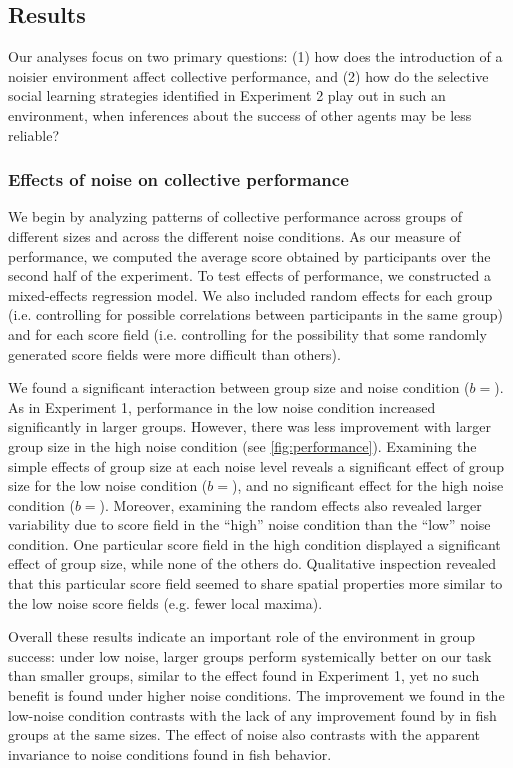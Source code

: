 \documentclass[12pt,letterpaper]{article}
\begin{document}
\subsection{Results}

Our analyses focus on two primary questions: (1) how does the introduction of a noisier environment affect collective performance, and (2) how do the selective social learning strategies identified in Experiment 2 play out in such an environment, when inferences about the success of other agents may be less reliable?

\subsubsection{Effects of noise on collective performance}

We begin by analyzing patterns of collective performance across groups of different sizes and across the different noise conditions.
As our measure of performance, we computed the average score obtained by participants over the second half of the experiment.
To test effects of performance, we constructed a mixed-effects regression model.
We also included random effects for each group (i.e. controlling for possible correlations between participants in the same group) and for each score field (i.e. controlling for the possibility that some randomly generated score fields were more difficult than others).

We found a significant interaction between group size and noise condition ($b = $). 
As in Experiment 1, performance in the low noise condition increased significantly in larger groups.  
However, there was less improvement with larger group size in the high noise condition (see \ref{fig:performance}). 
Examining the simple effects of group size at each noise level reveals a significant effect of group size for the low noise condition ($b = $), and no significant effect for the high noise condition ($b = $). 
Moreover, examining the random effects also revealed larger variability due to score field in the ``high'' noise condition than the ``low'' noise condition.
One particular score field in the high condition displayed a significant effect of group size, while none of the others do. 
Qualitative inspection revealed that this particular score field seemed to share spatial properties more similar to the low noise score fields (e.g. fewer local maxima).  

Overall these results indicate an important role of the environment in group success: under low noise, larger groups perform systemically better on our task than smaller groups, similar to the effect found in Experiment 1, yet no such benefit is found under higher noise conditions.
The improvement we found in the low-noise condition contrasts with the lack of any improvement found by  in fish groups at the same sizes.
The effect of noise also contrasts with the apparent invariance to noise conditions found in fish behavior.
\end{document}
